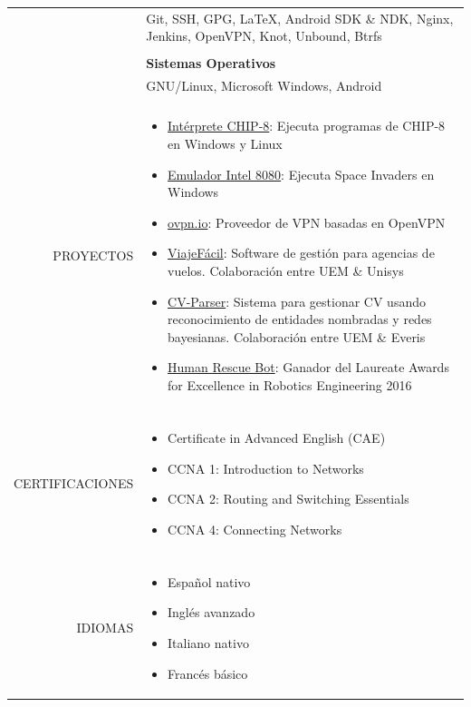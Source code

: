 \documentclass[a4paper, 11pt]{article}
\begin{document}
\begin{longtable}{rp{11cm}}
        & Git, SSH, GPG, \LaTeX, Android SDK \& NDK, Nginx, Jenkins, OpenVPN, Knot, Unbound, Btrfs\\\\
        & {\bf Sistemas Operativos}\\
        & GNU/Linux, Microsoft Windows, Android\\
        \\
        PROYECTOS
        & \vspace{-8mm}
        \begin{itemize}[leftmargin=0cm,label={}]
            \item \href{https://github.com/hugo19941994/CHIP8-Emu}{Intérprete CHIP-8}: Ejecuta programas de CHIP-8 en Windows y Linux
            \item \href{https://github.com/hugo19941994/SpaceInvaders-Emu}{Emulador Intel 8080}: Ejecuta Space Invaders en Windows
            \item \href{https://ovpn.io}{ovpn.io}: Proveedor de VPN basadas en OpenVPN
            \item \href{https://github.com/hugo19941994/ViajeFacil}{ViajeFácil}: Software de gestión para agencias de vuelos. Colaboración entre UEM \& Unisys
            \item \href{https://github.com/hugo19941994/CV-Parser}{CV-Parser}: Sistema para gestionar CV usando reconocimiento de entidades nombradas y redes bayesianas. Colaboración entre UEM \& Everis
            \item \href{https://github.com/hugo19941994/robot}{Human Rescue Bot}: Ganador del Laureate Awards for Excellence in Robotics Engineering 2016
        \end{itemize}\\
        \\
        CERTIFICACIONES
        & \vspace{-8mm}
        \begin{itemize}[leftmargin=0cm,label={},noitemsep]
            \item Certificate in Advanced English (CAE)
            \item CCNA 1: Introduction to Networks
            \item CCNA 2: Routing and Switching Essentials
            \item CCNA 4: Connecting Networks
        \end{itemize}\\
        \\
        IDIOMAS
        & \vspace{-8mm}
        \begin{itemize}[leftmargin=0cm,label={},noitemsep]
            \item Español nativo
            \item Inglés avanzado
            \item Italiano nativo
            \item Francés básico
        \end{itemize}
    \end{longtable}
\end{document}
